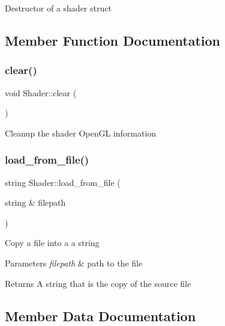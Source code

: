 Destructor of a shader struct 

\subsection{Member Function Documentation}
\mbox{\label{classShader_a59d3c7d6dcb0d0801e836b7a11d8095f}} 
\subsubsection{\texorpdfstring{clear()}{clear()}}
{\footnotesize\ttfamily void Shader\+::clear (\begin{DoxyParamCaption}{ }\end{DoxyParamCaption})}

Cleanup the shader Open\+GL information \mbox{\label{classShader_ad643b976d3d920e95bf6f9f4848e6049}} 
\subsubsection{\texorpdfstring{load\+\_\+from\+\_\+file()}{load\_from\_file()}}
{\footnotesize\ttfamily string Shader\+::load\+\_\+from\+\_\+file (\begin{DoxyParamCaption}\item[{string \&}]{filepath }\end{DoxyParamCaption})}

Copy a file into a a string


\begin{DoxyParams}{Parameters}
{\em filepath} & path to the file \\
\hline
\end{DoxyParams}
\begin{DoxyReturn}{Returns}
A string that is the copy of the source file 
\end{DoxyReturn}


\subsection{Member Data Documentation}
\mbox{\label{classShader_a32243cdb8d63a829450d0a46686c629b}} 
